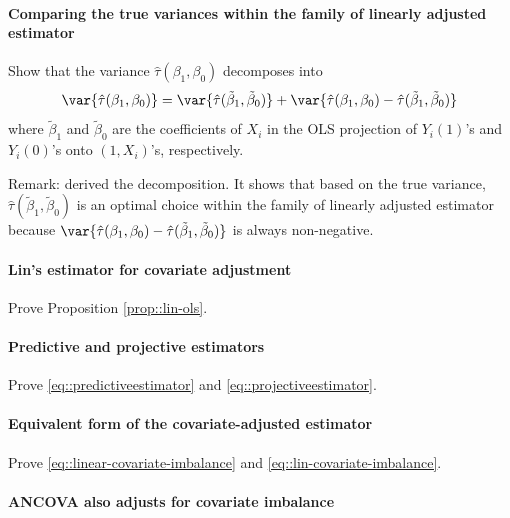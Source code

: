 \paragraph{Comparing the true variances within the family of linearly adjusted estimator}\label{hw::compare-true-variance} 



Show that the variance $\hat{\tau}(\beta_1, \beta_0)$ decomposes into
$$
\var\{ \hat{\tau}(\beta_1, \beta_0) \} 
=  
\var\{ \hat{\tau}( \tilde{\beta}_1, \tilde{\beta}_0) \}  
+
\var\{ \hat{\tau}(\beta_1, \beta_0) - \hat{\tau}(\tilde{\beta}_1, \tilde{\beta}_0) \}
$$
where $\tilde{\beta}_1$ and $\tilde{\beta}_0$ are the coefficients of $X_i$ in the OLS projection of $Y_i(1)$'s and $Y_i(0)$'s onto $(1, X_i)$'s, respectively. 



Remark: \citet[][Example 9]{li2017general} derived the decomposition. It shows that based on the true variance, $\hat{\tau}( \tilde{\beta}_1, \tilde{\beta}_0)$ is an optimal choice within the family of linearly adjusted estimator because $\var\{ \hat{\tau}(\beta_1, \beta_0) - \hat{\tau}(\tilde{\beta}_1, \tilde{\beta}_0) \}$ is always non-negative.   




\paragraph{Lin's estimator for covariate adjustment}\label{para::lin-ols-covadj}

Prove Proposition \ref{prop::lin-ols}. 

\paragraph{Predictive and projective estimators}\label{para::predictiveestimator}
Prove \eqref{eq::predictiveestimator} and \eqref{eq::projectiveestimator}. 
 
 
 \paragraph{Equivalent form of the covariate-adjusted estimator}\label{para::reg-covariate-imbalance}

Prove \eqref{eq::linear-covariate-imbalance} and \eqref{eq::lin-covariate-imbalance}. 
 
 
 
\paragraph{ANCOVA also adjusts for covariate imbalance}
\label{para::ancova-imbalance}

